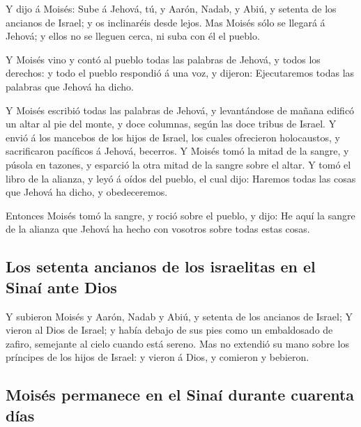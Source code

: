  Y dijo á Moisés: Sube á Jehová, tú, y Aarón, Nadab, y
Abiú, y setenta de los ancianos de Israel; y os inclinaréis desde lejos.
 Mas Moisés sólo se llegará á Jehová; y ellos no se
lleguen cerca, ni suba con él el pueblo.

 Y Moisés vino y contó al pueblo todas las palabras de
Jehová, y todos los derechos: y todo el pueblo respondió á una voz, y
dijeron: Ejecutaremos todas las palabras que Jehová ha dicho.

 Y Moisés escribió todas las palabras de Jehová, y
levantándose de mañana edificó un altar al pie del monte, y doce
columnas, según las doce tribus de Israel.  Y envió á los
mancebos de los hijos de Israel, los cuales ofrecieron holocaustos, y
sacrificaron pacíficos á Jehová, becerros.  Y Moisés tomó
la mitad de la sangre, y púsola en tazones, y esparció la otra mitad de
la sangre sobre el altar.  Y tomó el libro de la alianza,
y leyó á oídos del pueblo, el cual dijo: Haremos todas las cosas que
Jehová ha dicho, y obedeceremos.

 Entonces Moisés tomó la sangre, y roció sobre el pueblo,
y dijo: He aquí la sangre de la alianza que Jehová ha hecho con vosotros
sobre todas estas cosas.

\hypertarget{los-setenta-ancianos-de-los-israelitas-en-el-sinauxed-ante-dios}{%
\subsection{Los setenta ancianos de los israelitas en el Sinaí ante
Dios}\label{los-setenta-ancianos-de-los-israelitas-en-el-sinauxed-ante-dios}}

 Y subieron Moisés y Aarón, Nadab y Abiú, y setenta de los
ancianos de Israel;  Y vieron al Dios de Israel; y había
debajo de sus pies como un embaldosado de zafiro, semejante al cielo
cuando está sereno.  Mas no extendió su mano sobre los
príncipes de los hijos de Israel: y vieron á Dios, y comieron y
bebieron.

\hypertarget{moisuxe9s-permanece-en-el-sinauxed-durante-cuarenta-duxedas}{%
\subsection{Moisés permanece en el Sinaí durante cuarenta
días}\label{moisuxe9s-permanece-en-el-sinauxed-durante-cuarenta-duxedas}}

